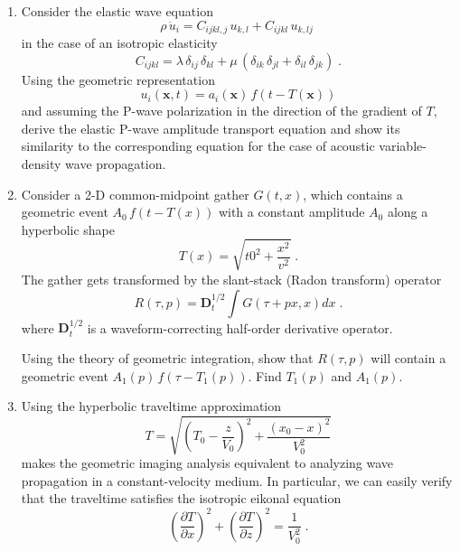 \begin{enumerate}
\item Consider the elastic wave equation
\begin{equation}
  \label{eq:ewave}
  \rho\,\ddot{u}_i = C_{ijkl,j}\,u_{k,l} + C_{ijkl}\,u_{k,lj}\;
\end{equation}
in the case of an isotropic elasticity
\begin{equation}
  \label{eq:lame}
  C_{ijkl} = \lambda\,\delta_{ij}\,\delta_{kl} + 
  \mu\,(\delta_{ik}\,\delta_{jl} + \delta_{il}\,\delta_{jk})\;.
\end{equation}
Using the geometric representation
\begin{equation}
  u_i(\mathbf{x},t) = a_i(\mathbf{x})\,f\left(t-T(\mathbf{x})\right)
  \label{eq:gwave}
\end{equation}
and assuming the P-wave polarization in the direction of the gradient
of $T$, derive the elastic P-wave amplitude transport equation and
show its similarity to the corresponding equation for the case of
acoustic variable-density wave propagation.
\item Consider a 2-D common-midpoint gather $G(t,x)$, which
  contains a geometric event $A_0\,f\left(t-T(x)\right)$ with a
  constant amplitude $A_0$ along a hyperbolic shape
\begin{equation}
\label{eq:hyper}
T(x) = \sqrt{t0^2+\frac{x^2}{v^2}}\;.
\end{equation}
The gather gets transformed by the slant-stack (Radon transform) operator
\begin{equation}
\label{eq:radon}
R(\tau,p) = \mathbf{D}_t^{1/2} \int G(\tau + p x, x) d x\;.
\end{equation}
where $ \mathbf{D}_t^{1/2}$ is a waveform-correcting half-order
derivative operator.

Using the theory of geometric integration, show that $R(\tau,p)$
will contain a geometric event $A_1(p)\,f\left(\tau-T_1(p)\right)$.
Find $T_1(p)$ and $A_1(p)$.

\item Using the hyperbolic traveltime approximation
\begin{equation}
T = \sqrt{\left(T_0-\frac{z}{V_0}\right)^2 + \frac{(x_0-x)^2}{V_0^2}}
\end{equation}
makes the geometric imaging analysis equivalent to analyzing wave
propagation in a constant-velocity medium. In particular, we can easily
verify that the traveltime satisfies the isotropic eikonal equation 
\begin{equation}
\left(\frac{\partial T}{\partial x}\right)^2 + \left(\frac{\partial T}{\partial z}\right)^2 = \frac{1}{V_0^2}\;.
\end{equation}


\end{enumerate}
